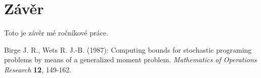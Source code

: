 \documentclass[12pt,a4paper]{report}
\begin{document}
\chapter{Závěr}
Toto je závěr mé ročníkové práce.

\begin{thebibliography}{99}

Birge J. R., Wets R. J.-B. (1987): Computing bounds for stochastic programing problems by means of a generalized moment problem. \textit{Mathematics of Operations Research} \textbf{12}, 149-162.
\end{thebibliography}


\openright
\end{document}
